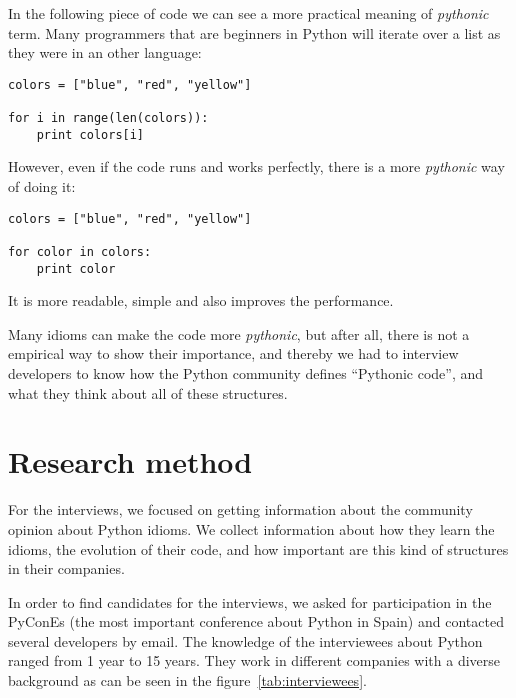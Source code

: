 \documentclass[a4paper]{article}
\begin{document}
In the following piece of code we can see a more practical meaning of \textit{pythonic} term. Many programmers that are beginners in Python will iterate over a list as they were in an other language:

\begin{verbatim}
colors = ["blue", "red", "yellow"]

for i in range(len(colors)):
    print colors[i]
\end{verbatim}

However, even if the code runs and works perfectly, there is a more \emph{pythonic} way of
doing it:

\begin{verbatim}
colors = ["blue", "red", "yellow"]

for color in colors:
    print color
\end{verbatim}

It is more readable, simple and also improves the performance.

Many idioms can make the code more \textit{pythonic}, but after all, there is not a  empirical way to show their importance, and thereby we had to interview developers to know how the Python community defines ``Pythonic code'', and what they think about all of these structures.


\section{Research method}

For the interviews, we focused on getting information about the community opinion about Python idioms. We collect information about how they learn the idioms, the evolution of their code, and how important are this kind of structures in their companies.

In order to find candidates for the interviews, we asked for participation in the PyConEs (the most important conference about Python in Spain) and contacted several developers by email. The knowledge of the interviewees about Python ranged from 1 year to 15 years. They work in different companies with a diverse background as can be seen in the figure~\ref{tab:interviewees}.
\end{document}
